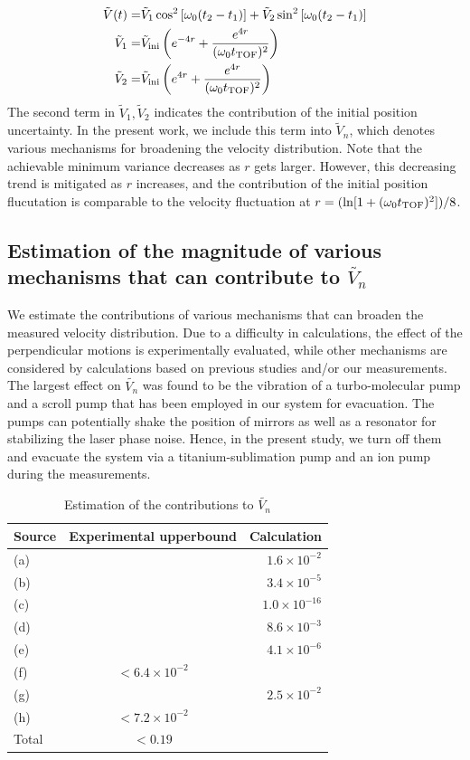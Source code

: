 \documentclass[aps, prl, 
amsmath, showpacs, preprintnumbers, twocolumn, amssymb, amsmath, superscriptaddress]{revtex4-1}
\begin{document}
\begin{eqnarray}
\tilde{V}(t) =& \tilde{V}_1 \cos^2 \left[ \omega_0 (t_2-t_1) \right] +  \tilde{V}_2 \sin^2 \left[ \omega_0 (t_2-t_1) \right] \\ 
\tilde{V}_1 =& \tilde{V}_{\rm ini} \left( e^{-4r}+\dfrac{e^{4r}}{(\omega_0  t_{\rm TOF})^2} \right)\\ 
\label{eq:V1}
\tilde{V}_2 =& \tilde{V}_{\rm ini} \left( e^{4r}+\dfrac{e^{4r}}{(\omega_0  t_{\rm TOF})^2} \right) 
\end{eqnarray} 
The second term in $\tilde{V}_1,\tilde{V}_2$ indicates the contribution of the initial position uncertainty. In the present work, we include this term into $\tilde{V}_n$, which denotes various mechanisms for broadening the velocity distribution. Note that the achievable minimum variance decreases as $r$ gets larger. However, this decreasing trend is mitigated as $r$ increases, and the contribution of the initial position flucutation is comparable to the velocity fluctuation at $r= (\ln[1+(\omega_0 t_{\rm TOF})^2])/8$. 

\subsection{Estimation of the magnitude of various mechanisms that can contribute to $\tilde{V_n}$}
We estimate the contributions of various mechanisms that can broaden the measured velocity distribution. Due to a difficulty in calculations, the effect of the perpendicular motions is experimentally evaluated, while other mechanisms are considered by calculations based on previous studies and/or our measurements. The largest effect on $\tilde{V_n}$ was found to be the vibration of a turbo-molecular pump and a scroll pump that has been employed in our system for evacuation. The pumps can potentially shake the position of mirrors as well as a resonator for stabilizing the laser phase noise. Hence, in the present study, we turn off them and evacuate the system via a titanium-sublimation pump and an ion pump during the measurements.

\begin{table}
  \caption{Estimation of the contributions to $\tilde{V_n}$}
  \label{tab:systematic}
  \centering
  \begin{tabular}{lcr}
    \hline
    Source  & Experimental upperbound & Calculation \\
    \hline \hline
    (a)  & & $1.6 \times 10^{-2}$ \\
    (b)  & & $3.4 \times 10^{-5}$ \\
    (c)  &   & $1.0 \times 10^{-16}$ \\
    (d)   & & $8.6 \times 10^{-3}$ \\
    (e)  &  &  $4.1 \times 10^{-6}$ \\
    (f)  & $<6.4 \times 10^{-2}$ & \\
    (g)  &  &  $2.5 \times 10^{-2}$ \\
    (h)  &$<7.2 \times 10^{-2}$  &   \\
    \hline \hline
    Total & $<0.19$  \\
    \hline
  \end{tabular}
\end{table}
\end{document}
